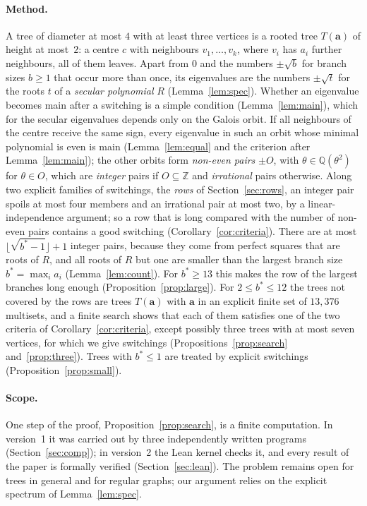 \documentclass[11pt]{article}
\numberwithin{equation}{section}
\theoremstyle{remark}
\newcommand{\Q}{\mathbb Q}
\newcommand{\Z}{\mathbb Z}
\newcommand{\bfa}{\mathbf a}
\begin{document}
\paragraph{Method.}
A tree of diameter at most $4$ with at least three vertices is a rooted tree
$T(\bfa)$ of height at most~$2$: a centre $c$ with neighbours $v_1,\dots,v_k$,
where $v_i$ has $a_i$ further neighbours, all of them leaves. Apart from $0$
and the numbers $\pm\sqrt b$ for branch sizes $b\ge1$ that occur more than
once, its eigenvalues are the numbers $\pm\sqrt t$ for the roots $t$ of a
\emph{secular polynomial} $R$ (Lemma~\ref{lem:spec}). Whether an eigenvalue
becomes main after a switching is a simple condition (Lemma~\ref{lem:main}),
which for the secular eigenvalues depends only on the Galois orbit. If all
neighbours of the centre receive the same sign, every eigenvalue in such an
orbit whose minimal polynomial is even is main (Lemma~\ref{lem:equal} and the
criterion after Lemma~\ref{lem:main}); the other orbits form
\emph{non-even pairs} $\pm O$, with $\theta\in\Q(\theta^2)$ for $\theta\in O$,
which are \emph{integer} pairs if $O\subseteq\Z$ and \emph{irrational} pairs
otherwise. Along two explicit families of switchings, the \emph{rows} of
Section~\ref{sec:rows}, an integer pair spoils at most four members and an
irrational pair at most two, by a linear-independence argument; so a row that
is long compared with the number of non-even pairs contains a good switching
(Corollary~\ref{cor:criteria}). There are at most
$\lfloor\sqrt{b^*-1}\rfloor+1$ integer pairs, because they come from perfect
squares that are roots of $R$, and all roots of $R$ but one are smaller than
the largest branch size $b^*=\max_ia_i$ (Lemma~\ref{lem:count}). For
$b^*\ge13$ this makes the row of the largest branches long enough
(Proposition~\ref{prop:large}). For $2\le b^*\le12$ the trees not covered by
the rows are trees $T(\bfa)$ with $\bfa$ in an explicit finite set of
$13{,}376$ multisets, and a finite search shows that each of them satisfies
one of the two criteria of Corollary~\ref{cor:criteria}, except possibly three
trees with at most seven vertices, for which we give switchings
(Propositions~\ref{prop:search} and~\ref{prop:three}). Trees with
$b^*\le1$ are treated by explicit switchings (Proposition~\ref{prop:small}).

\paragraph{Scope.}
One step of the proof, Proposition~\ref{prop:search}, is a finite computation.
In version~1 it was carried out by three independently written programs
(Section~\ref{sec:comp}); in version~2 the Lean kernel checks it, and every
result of the paper is formally verified (Section~\ref{sec:lean}). The problem
remains open for trees in general and for regular graphs; our argument relies
on the explicit spectrum of Lemma~\ref{lem:spec}.
\end{document}
